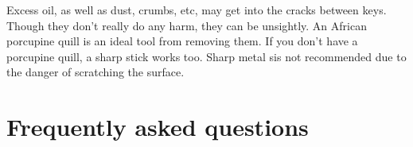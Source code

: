 Excess oil, as well as dust, crumbs, etc, may get into the cracks between keys.  Though they don't really do any harm, they can be unsightly.  An African porcupine quill is an ideal tool from removing them.  If you don't have a porcupine quill, a sharp stick works too.  Sharp metal sis not recommended due to the danger of scratching the surface. 


\appendix

\chapter{Frequently asked questions}




\printindex




